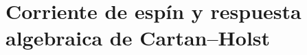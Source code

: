 %

\section{Corriente de espín y respuesta algebraica de Cartan--Holst}
\label{vii:vii:sec:corriente-respuesta-cartan}

